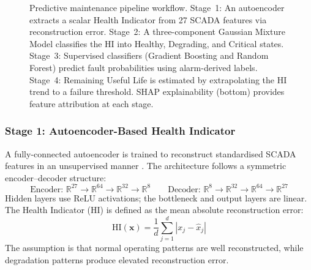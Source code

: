 \documentclass[12pt]{article}
\newcommand{\R}{\mathbb{R}}
\newcommand{\abs}[1]{\left| #1 \right|}
\newcommand{\vect}[1]{\mathbf{#1}}
\begin{document}
\begin{figure}[H]
{%
}%
\caption{Predictive maintenance pipeline workflow. Stage~1: An autoencoder extracts a scalar Health Indicator from 27 SCADA features via reconstruction error. Stage~2: A three-component Gaussian Mixture Model classifies the HI into Healthy, Degrading, and Critical states. Stage~3: Supervised classifiers (Gradient Boosting and Random Forest) predict fault probabilities using alarm-derived labels. Stage~4: Remaining Useful Life is estimated by extrapolating the HI trend to a failure threshold. SHAP explainability (bottom) provides feature attribution at each stage.}
\label{fig:pdm_pipeline}
\end{figure}

\subsubsection{Stage 1: Autoencoder-Based Health Indicator}

A fully-connected autoencoder is trained to reconstruct standardised SCADA features in an unsupervised manner \citep{Hinton2006}.
The architecture follows a symmetric encoder--decoder structure:
\begin{equation}
    \text{Encoder: } \R^{27} \xrightarrow{} \R^{64} \xrightarrow{} \R^{32} \xrightarrow{} \R^{8} \qquad
    \text{Decoder: } \R^{8} \xrightarrow{} \R^{32} \xrightarrow{} \R^{64} \xrightarrow{} \R^{27}
\end{equation}
Hidden layers use ReLU activations; the bottleneck and output layers are linear.
The Health Indicator (HI) is defined as the mean absolute reconstruction error:
\begin{equation}
    \text{HI}(\vect{x}) = \frac{1}{d} \sum_{j=1}^{d} \abs{x_j - \hat{x}_j}
\end{equation}
The assumption is that normal operating patterns are well reconstructed, while degradation patterns produce elevated reconstruction error.
\end{document}
